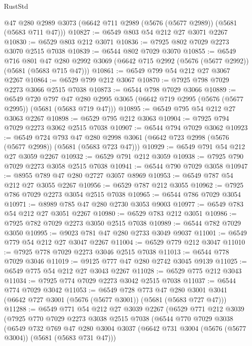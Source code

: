 \begin{lexlean}{RustStd}
\begin{coremodule}
    @47
    @280
    @2989
    @3073
    (@6642 @711 @2989 (@5676 (@5677 @2989)) (@5681 (@5683 @711 @47)))
@10827 := @6549 @803 @54 @212 @27 @3071 @2267
@10830 := @6529 @803 @212 @3071
@10836 := @7925 @802 @7029 @2273 @3070 @2515 @7038
@10839 := @6544 @802 @7029 @3070
@10855 := @6549
    @716
    @801
    @47
    @280
    @2992
    @3069
    (@6642 @715 @2992 (@5676 (@5677 @2992)) (@5681 (@5683 @715 @47)))
@10861 := @6549 @799 @54 @212 @27 @3067 @2267
@10864 := @6529 @799 @212 @3067
@10870 := @7925 @798 @7029 @2273 @3066 @2515 @7038
@10873 := @6544 @798 @7029 @3066
@10889 := @6549
    @720
    @797
    @47
    @280
    @2995
    @3065
    (@6642 @719 @2995 (@5676 (@5677 @2995)) (@5681 (@5683 @719 @47)))
@10895 := @6549 @795 @54 @212 @27 @3063 @2267
@10898 := @6529 @795 @212 @3063
@10904 := @7925 @794 @7029 @2273 @3062 @2515 @7038
@10907 := @6544 @794 @7029 @3062
@10923 := @6549
    @724
    @793
    @47
    @280
    @2998
    @3061
    (@6642 @723 @2998 (@5676 (@5677 @2998)) (@5681 (@5683 @723 @47)))
@10929 := @6549 @791 @54 @212 @27 @3059 @2267
@10932 := @6529 @791 @212 @3059
@10938 := @7925 @790 @7029 @2273 @3058 @2515 @7038
@10941 := @6544 @790 @7029 @3058
@10947 := @8955 @789 @47 @280 @2727 @3057 @8969
@10953 := @6549 @787 @54 @212 @27 @3055 @2267
@10956 := @6529 @787 @212 @3055
@10962 := @7925 @786 @7029 @2273 @3054 @2515 @7038
@10965 := @6544 @786 @7029 @3054
@10971 := @8989 @785 @47 @280 @2730 @3053 @9003
@10977 := @6549 @783 @54 @212 @27 @3051 @2267
@10980 := @6529 @783 @212 @3051
@10986 := @7925 @782 @7029 @2273 @3050 @2515 @7038
@10989 := @6544 @782 @7029 @3050
@10995 := @9023 @781 @47 @280 @2733 @3049 @9037
@11001 := @6549 @779 @54 @212 @27 @3047 @2267
@11004 := @6529 @779 @212 @3047
@11010 := @7925 @778 @7029 @2273 @3046 @2515 @7038
@11013 := @6544 @778 @7029 @3046
@11019 := @9125 @777 @47 @280 @2742 @3045 @9139
@11025 := @6549 @775 @54 @212 @27 @3043 @2267
@11028 := @6529 @775 @212 @3043
@11034 := @7925 @774 @7029 @2273 @3042 @2515 @7038
@11037 := @6544 @774 @7029 @3042
@11053 := @6549
    @728
    @773
    @47
    @280
    @3001
    @3041
    (@6642 @727 @3001 (@5676 (@5677 @3001)) (@5681 (@5683 @727 @47)))
@11288 := @6549
    @771
    @54
    @212
    @27
    @3039
    @2267
    (@6529
      @771
      @212
      @3039
      (@7925
        @770
        @7029
        @2273
        @3038
        @2515
        @7038
        (@6544
          @770
          @7029
          @3038
          (@6549
            @732
            @769
            @47
            @280
            @3004
            @3037
            (@6642 @731 @3004 (@5676 (@5677 @3004)) (@5681 (@5683 @731 @47)))

\end{coremodule}
\end{lexlean}
